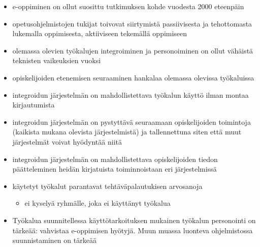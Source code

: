 \begin{itemize}
    \item e-oppiminen on ollut suosittu tutkimuksen kohde vuodesta 2000 eteenpäin\cite{Brusilovsky:2010:LSP:1656255.1656257}
    \item opetusohjelmistojen tukijat toivovat siirtymistä passiivisesta ja tehottomasta lukemalla oppimisesta, aktiiviseen tekemällä oppimiseen\cite{Brusilovsky:2010:LSP:1656255.1656257}
    \item olemassa olevien työkalujen integroiminen ja personoiminen on ollut vähäistä teknisten vaikeuksien vuoksi
    \item opiskelijoiden etenemisen seuraaminen hankalaa olemassa olevissa työkaluissa
    \item integroidun järjestelmän on mahdollistettava työkalun käyttö ilman montaa kirjautumista
    \item integroidun järjestelmän on pystyttävä seuraamaan opiskelijoiden toimintoja (kaikista mukana olevista järjestelmistä) ja tallennettuna siten että muut järjestelmät voivat hyödyntää niitä
    \item integroidun järjestelmän on mahdollistettava opiskelijoiden tiedon päätteleminen heidän kirjatuista toiminnoistaan eri järjestelmissä
    \item käytetyt työkalut parantavat tehtäväpalautukisen arvosanoja
    \begin{itemize}
        \item ei kyselyä ryhmälle, joka ei käyttänyt työkalua
    \end{itemize}
    \item Työkalua suunnitellessa käyttötarkoituksen mukainen työkalun personointi on tärkeää: vahvistaa e-oppimisen hyötyjä. Muun muassa luonteva ohjelmistossa suunnistaminen on tärkeää
\end{itemize}


